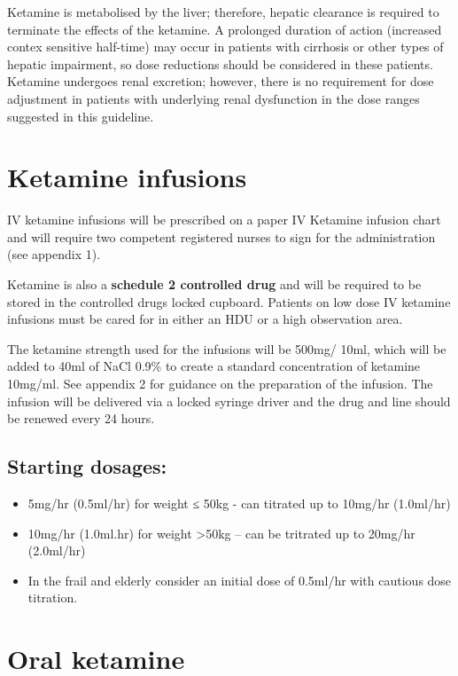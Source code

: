 \documentclass[
]{book}
\begin{document}
Ketamine is metabolised by the liver; therefore, hepatic clearance is required to terminate the effects of the ketamine. A prolonged duration of action (increased contex sensitive half-time) may occur in patients with cirrhosis or other types of hepatic impairment, so dose reductions should be considered in these patients. Ketamine undergoes renal excretion; however, there is no requirement for dose adjustment in patients with underlying renal dysfunction in the dose ranges suggested in this guideline.

\hypertarget{ketamine-infusions}{%
\chapter{Ketamine infusions}\label{ketamine-infusions}}

IV ketamine infusions will be prescribed on a paper IV Ketamine infusion chart and will require two competent registered nurses to sign for the administration (see appendix 1).

Ketamine is also a \textbf{schedule 2 controlled drug} and will be required to be stored in the controlled drugs locked cupboard. Patients on low dose IV ketamine infusions must be cared for in either an HDU or a high observation area.

The ketamine strength used for the infusions will be 500mg/ 10ml, which will be added to 40ml of NaCl 0.9\% to create a standard concentration of ketamine 10mg/ml. See appendix 2 for guidance on the preparation of the infusion. The infusion will be delivered via a locked syringe driver and the drug and line should be renewed every 24 hours.

\hypertarget{starting-dosages}{%
\section{Starting dosages:}\label{starting-dosages}}

\begin{itemize}
\item
  5mg/hr (0.5ml/hr) for weight ≤ 50kg - can titrated up to 10mg/hr (1.0ml/hr)
\item
  10mg/hr (1.0ml.hr) for weight \textgreater50kg -- can be tritrated up to 20mg/hr (2.0ml/hr)
\item
  In the frail and elderly consider an initial dose of 0.5ml/hr with cautious dose titration.
\end{itemize}

\hypertarget{oral-ketamine}{%
\chapter{Oral ketamine}\label{oral-ketamine}}
\end{document}
